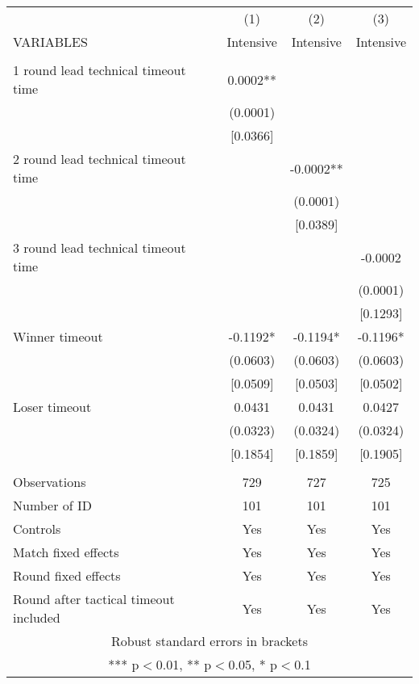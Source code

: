 \documentclass[]{article}
\begin{document}
\begin{tabular}{lccc} \hline
 & (1) & (2) & (3) \\
VARIABLES & Intensive & Intensive & Intensive \\ \hline
 &  &  &  \\
1 round lead technical timeout time & 0.0002** &  &  \\
 & (0.0001) &  &  \\
 & [0.0366] &  &  \\
2 round lead technical timeout time &  & -0.0002** &  \\
 &  & (0.0001) &  \\
 &  & [0.0389] &  \\
3 round lead technical timeout time &  &  & -0.0002 \\
 &  &  & (0.0001) \\
 &  &  & [0.1293] \\
Winner timeout & -0.1192* & -0.1194* & -0.1196* \\
 & (0.0603) & (0.0603) & (0.0603) \\
 & [0.0509] & [0.0503] & [0.0502] \\
Loser timeout & 0.0431 & 0.0431 & 0.0427 \\
 & (0.0323) & (0.0324) & (0.0324) \\
 & [0.1854] & [0.1859] & [0.1905] \\
 &  &  &  \\
Observations & 729 & 727 & 725 \\
Number of ID & 101 & 101 & 101 \\
Controls & Yes & Yes & Yes \\
Match fixed effects & Yes & Yes & Yes \\
Round fixed effects & Yes & Yes & Yes \\
 Round after tactical timeout included & Yes & Yes & Yes \\ \hline
\multicolumn{4}{c}{ Robust standard errors in brackets} \\
\multicolumn{4}{c}{ *** p$<$0.01, ** p$<$0.05, * p$<$0.1} \\
\end{tabular}
\end{document}
